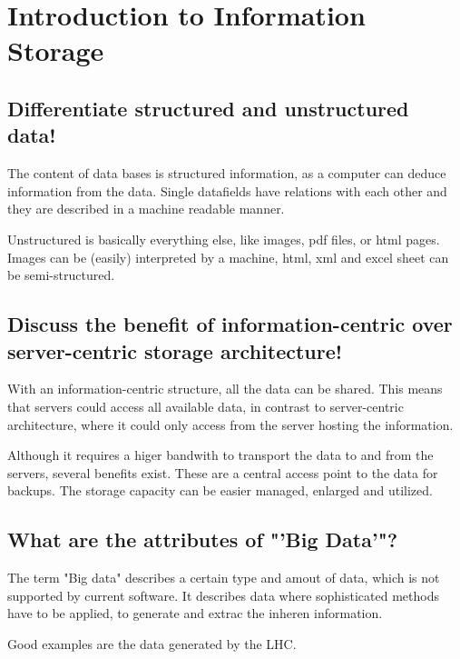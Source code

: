 \section{Introduction to Information Storage} %
\label{sec:introduction_to_information_storage}

\subsection{Differentiate structured and unstructured data!} %
\label{sub:differentiate_structured_and_unstructured_data}
	The content of data bases is structured information,
	as a computer can deduce information from the data.
	Single datafields have relations with each other
	and they are described in a machine readable manner.

	Unstructured is basically everything else,
	like images, pdf files, or html pages.
	Images can be (easily) interpreted by a machine,
	html, xml and excel sheet can be semi-structured.

\subsection{Discuss the benefit of information-centric over server-centric storage architecture!} %
\label{sub:discuss_the_benefit_of_information_centric_over_server_centric_storage_architecture}
	With an information-centric structure,
	all the data can be shared.
	This means that servers could access all available data,
	in contrast to server-centric architecture,
	where it could only access from the server hosting the information.

	Although it requires a higer bandwith to transport the data to and from the servers,
	several benefits exist.
	These are a central access point to the data for backups.
	The storage capacity can be easier managed, enlarged and utilized.

\subsection{What are the attributes of "'Big Data'"?} %
\label{sub:what_are_the_attributes_of_big_data}
	The term "Big data" describes a certain type and amout of data,
	which is not supported by current software.
	It describes data where sophisticated methods have to be applied,
	to generate and extrac the inheren information.

	Good examples are the data generated by the LHC.

